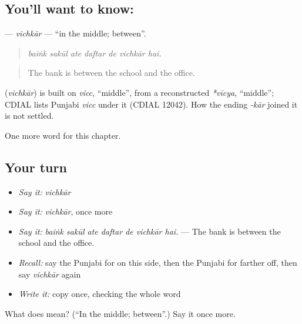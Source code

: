 \subsection*{You'll want to know: }
\textbf{} — \emph{vichkār} — \textquotedblleft{}in the middle; between\textquotedblright{}.

\begin{quote}
      
\end{quote}

\begin{quote}
\emph{baiṅk sakūl ate daftar de vichkār hai.}
\end{quote}

\begin{quote}
The bank is between the school and the office.
\end{quote}

\begin{cousinweb}
\textbf{} (\emph{vichkār}) is built on \emph{vicc}, \textquotedblleft{}middle\textquotedblright{}, from a reconstructed \emph{*vīcya}, \textquotedblleft{}middle\textquotedblright{}; CDIAL lists Punjabi \emph{vicc} under it (CDIAL 12042). How the ending \emph{-kār} joined it is not settled.
\end{cousinweb}

\begin{grammarlens}[title={What you've built}]
One more word for this chapter.
\end{grammarlens}

\subsection*{Your turn}
\begin{itemize}
\raggedright
  \item \emph{Say it:} \emph{vichkār}
  \item \emph{Say it:} \emph{vichkār}, once more
  \item \emph{Say it:} \emph{baiṅk sakūl ate daftar de vichkār hai.} — The bank is between the school and the office.
  \item \emph{Recall:} say the Punjabi for on this side, then the Punjabi for farther off, then say \emph{vichkār} again
  \item \emph{Write it:} copy \textbf{} once, checking the whole word
\end{itemize}

\begin{tcolorbox}[breakable,colback=teal!4,colframe=teal!35!black,title={Before you move on}]
What does  mean? (\textquotedblleft{}In the middle; between\textquotedblright{}.) Say it once more.
\end{tcolorbox}
